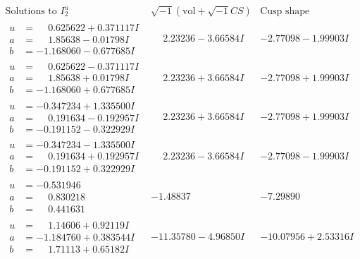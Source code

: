 \documentclass[1p]{elsarticle_modified}
\theoremstyle{definition}
\newcommand{\I}{\sqrt{-1}}
\begin{document}
$$\begin{array}{c|c|c}  
\text{Solutions to }I^u_{2}& \I (\text{vol} + \sqrt{-1}CS) & \text{Cusp shape}\\
 \hline 
\begin{aligned}
u &= \phantom{-}0.625622 + 0.371117 I \\
a &= \phantom{-}1.85638 - 0.01798 I \\
b &= -1.168060 - 0.677685 I\end{aligned}
 & \phantom{-}2.23236 - 3.66584 I & -2.77098 - 1.99903 I \\ \hline\begin{aligned}
u &= \phantom{-}0.625622 - 0.371117 I \\
a &= \phantom{-}1.85638 + 0.01798 I \\
b &= -1.168060 + 0.677685 I\end{aligned}
 & \phantom{-}2.23236 + 3.66584 I & -2.77098 + 1.99903 I \\ \hline\begin{aligned}
u &= -0.347234 + 1.335500 I \\
a &= \phantom{-}0.191634 - 0.192957 I \\
b &= -0.191152 - 0.322929 I\end{aligned}
 & \phantom{-}2.23236 + 3.66584 I & -2.77098 + 1.99903 I \\ \hline\begin{aligned}
u &= -0.347234 - 1.335500 I \\
a &= \phantom{-}0.191634 + 0.192957 I \\
b &= -0.191152 + 0.322929 I\end{aligned}
 & \phantom{-}2.23236 - 3.66584 I & -2.77098 - 1.99903 I \\ \hline\begin{aligned}
u &= -0.531946\phantom{ +0.000000I} \\
a &= \phantom{-}0.830218\phantom{ +0.000000I} \\
b &= \phantom{-}0.441631\phantom{ +0.000000I}\end{aligned}
 & -1.48837\phantom{ +0.000000I} & -7.29890\phantom{ +0.000000I} \\ \hline\begin{aligned}
u &= \phantom{-}1.14606 + 0.92119 I \\
a &= -1.184760 + 0.383544 I \\
b &= \phantom{-}1.71113 + 0.65182 I\end{aligned}
 & -11.35780 - 4.96850 I & -10.07956 + 2.53316 I \\ \hline\begin{aligned}

\end{aligned}
\end{array}$$
\end{document}
